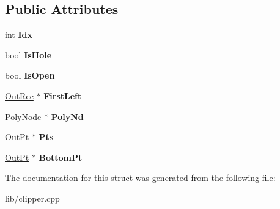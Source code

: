 \subsection*{Public Attributes}
\begin{DoxyCompactItemize}
\item 
\mbox{\label{struct_clipper_lib_1_1_out_rec_ae2c437dec114034a456a7238ab6d8055}} 
int {\bfseries Idx}
\item 
\mbox{\label{struct_clipper_lib_1_1_out_rec_a18b2b534b717139528047ba10a1c805c}} 
bool {\bfseries Is\+Hole}
\item 
\mbox{\label{struct_clipper_lib_1_1_out_rec_a065731c084453a818939c219868a2fcc}} 
bool {\bfseries Is\+Open}
\item 
\mbox{\label{struct_clipper_lib_1_1_out_rec_aa8baa934f1a7687a16b88a579dec3dd4}} 
\hyperlink{struct_clipper_lib_1_1_out_rec}{Out\+Rec} $\ast$ {\bfseries First\+Left}
\item 
\mbox{\label{struct_clipper_lib_1_1_out_rec_a334af720a9e0a815ba690e80e32bebd1}} 
\hyperlink{class_clipper_lib_1_1_poly_node}{Poly\+Node} $\ast$ {\bfseries Poly\+Nd}
\item 
\mbox{\label{struct_clipper_lib_1_1_out_rec_a82e9cba88d46d0d60db0b0365c6bd02e}} 
\hyperlink{struct_clipper_lib_1_1_out_pt}{Out\+Pt} $\ast$ {\bfseries Pts}
\item 
\mbox{\label{struct_clipper_lib_1_1_out_rec_adc4d612df109de83dca298204176ff0c}} 
\hyperlink{struct_clipper_lib_1_1_out_pt}{Out\+Pt} $\ast$ {\bfseries Bottom\+Pt}
\end{DoxyCompactItemize}


The documentation for this struct was generated from the following file\+:\begin{DoxyCompactItemize}
\item 
lib/clipper.\+cpp\end{DoxyCompactItemize}
